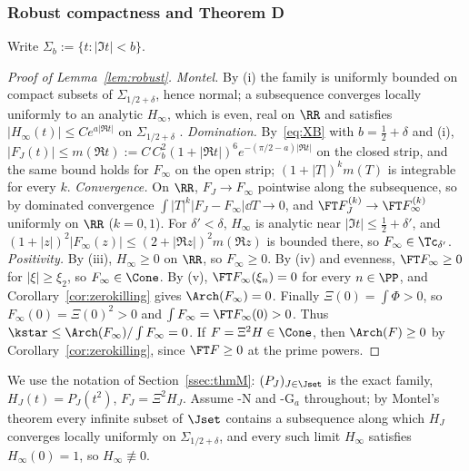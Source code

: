 \subsubsection{Robust compactness and Theorem D}\label{app:proofs-M}

Write $\Sigma_b:=\{t:\lvert\Im t\rvert<b\}$.

\begin{proof}[Proof of Lemma~\textup{\ref{lem:robust}}]
\emph{Montel.} By (i) the family is uniformly bounded on compact subsets of $\Sigma_{1/2+\delta}$, hence normal; a
subsequence converges locally uniformly to an analytic $H_\infty$, which is even, real on $\RR$ and satisfies
$\lvert H_\infty(t)\rvert\le Ce^{a\lvert\Re t\rvert}$ on $\Sigma_{1/2+\delta}$ \cite[VII.2.9]{Con73}.
\emph{Domination.} By~\eqref{eq:XB} with $b=\frac12+\delta$ and (i),
$\lvert F_J(t)\rvert\le m(\Re t):=C\,C_b^2(1+\lvert\Re t\rvert)^6e^{-(\pi/2-a)\lvert\Re t\rvert}$ on the closed strip, and
the same bound holds for $F_\infty$ on the open strip; $(1+\lvert T\rvert)^km(T)$ is integrable for every $k$.
\emph{Convergence.} On $\RR$, $F_J\to F_\infty$ pointwise along the subsequence, so by dominated convergence
$\int\lvert T\rvert^k\lvert F_J-F_\infty\rvert\dd T\to0$, and $\FT F_J^{(k)}\to\FT F_\infty^{(k)}$ uniformly on $\RR$
($k=0,1$). For $\delta'<\delta$, $H_\infty$ is analytic near $\lvert\Im t\rvert\le\frac12+\delta'$, and
$(1+\lvert z\rvert)^2\lvert F_\infty(z)\rvert\le(2+\lvert\Re z\rvert)^2m(\Re z)$ is bounded there, so $F_\infty\in\Tc_{\delta'}$.
\emph{Positivity.} By (iii), $H_\infty\ge0$ on $\RR$, so $F_\infty\ge0$. By (iv) and evenness,
$\FT F_\infty\ge0$ for $\lvert\xi\rvert\ge\xi_2$, so $F_\infty\in\Cone$. By (v), $\FT F_\infty(\xi_n)=0$ for every
$n\in\PP$, and Corollary~\ref{cor:zerokilling} gives $\Arch(F_\infty)=0$. Finally $\Xi(0)=\int\Phi>0$, so
$F_\infty(0)=\Xi(0)^2>0$ and $\int F_\infty=\FT F_\infty(0)>0$. Thus $\kstar\le\Arch(F_\infty)/\int F_\infty=0$. If $F=\Xi^2H\in\Cone$,
then $\Arch(F)\ge0$ by Corollary~\ref{cor:zerokilling}, since $\FT F\ge0$ at the prime powers.
\end{proof}


We use the notation of Section~\ref{ssec:thmM}: $(P_J)_{J\in\Jset}$ is the exact family, $H_J(t)=P_J(t^2)$,
$F_J=\Xi^2H_J$. Assume \hyp{N} and \hyp{G$_a$} throughout; by Montel's theorem
\cite[VII.2.9]{Con73} every infinite subset of $\Jset$ contains a subsequence along which $H_J$ converges locally uniformly
on $\Sigma_{1/2+\delta}$, and every such limit $H_\infty$ satisfies $H_\infty(0)=1$, so $H_\infty\not\equiv0$.

